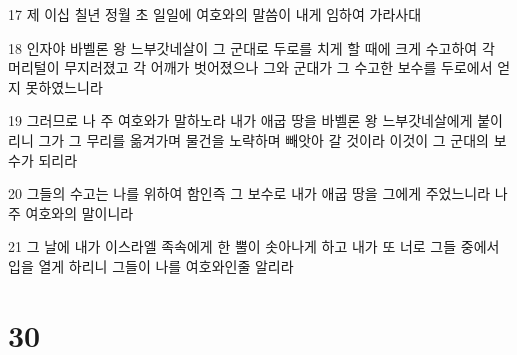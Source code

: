 \par 17 제 이십 칠년 정월 초 일일에 여호와의 말씀이 내게 임하여 가라사대
\par 18 인자야 바벨론 왕 느부갓네살이 그 군대로 두로를 치게 할 때에 크게 수고하여 각 머리털이 무지러졌고 각 어깨가 벗어졌으나 그와 군대가 그 수고한 보수를 두로에서 얻지 못하였느니라
\par 19 그러므로 나 주 여호와가 말하노라 내가 애굽 땅을 바벨론 왕 느부갓네살에게 붙이리니 그가 그 무리를 옮겨가며 물건을 노략하며 빼앗아 갈 것이라 이것이 그 군대의 보수가 되리라
\par 20 그들의 수고는 나를 위하여 함인즉 그 보수로 내가 애굽 땅을 그에게 주었느니라 나 주 여호와의 말이니라
\par 21 그 날에 내가 이스라엘 족속에게 한 뿔이 솟아나게 하고 내가 또 너로 그들 중에서 입을 열게 하리니 그들이 나를 여호와인줄 알리라

\chapter{30}

